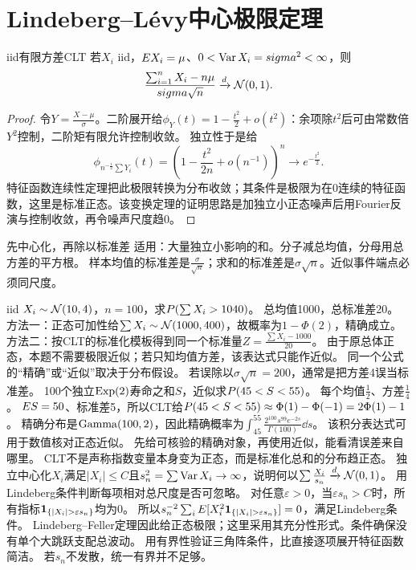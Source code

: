 \section{Lindeberg--Lévy中心极限定理}\label{sec:53}
\begin{theorem}{iid有限方差CLT}
若$X_i$ iid，$E X_i=\mu$、$0<\operatorname{Var} X_i=sigma^2<\infty$，则
\begin{equation}\dfrac{\sum_{i=1}^nX_i-n\mu}{sigma\sqrt n}\xrightarrow{d}\mathcal N(0,1).\label{eq:clt}\end{equation}
\end{theorem}
\begin{proof}
令$Y=\frac{X-\mu}{\sigma}$。二阶展开给$\phi_Y(t)=1-\frac{t^2}{2}+o(t^2)$：余项除$t^2$后可由常数倍$Y^2$控制，二阶矩有限允许控制收敛。
独立性于是给
\[\phi_{n^{-\frac{1}{2}}\sum Y_i}(t)=\left(1-\dfrac{t^2}{2n}+o(n^{-1})\right)^n\to e^{-\frac{t^2}{2}}.
\]
特征函数连续性定理把此极限转换为分布收敛；其条件是极限为在0连续的特征函数，这里是标准正态。该变换定理的证明思路是加独立小正态噪声后用Fourier反演与控制收敛，再令噪声尺度趋0。
\end{proof}
\begin{method}{先中心化，再除以标准差}
适用：大量独立小影响的和。分子减总均值，分母用总方差的平方根。
样本均值的标准差是$\frac{\sigma}{\sqrt n}$；求和的标准差是$\sigma\sqrt n$。近似事件端点必须同尺度。
\end{method}
{iid $X_i\sim\mathcal N(10,4)$，$n=100$，求$P(\sum X_i>1040)$。}
{总均值1000，总标准差20。}
{方法一：正态可加性给$\sum X_i\sim\mathcal N(1000,400)$，故概率为$1-\Phi(2)$，精确成立。
方法二：按CLT的标准化模板得到同一个标准量$Z=\frac{\sum X_i-1000}{20}$。
由于原总体正态，本题不需要极限近似；若只知均值方差，该表达式只能作近似。}
{同一个公式的“精确”或“近似”取决于分布假设。}
{若误除以$\sigma\sqrt n=200$，通常是把方差4误当标准差。}
{100个独立$\operatorname{Exp}(2)$寿命之和$S$，近似求$P(45<S<55)$。}
{每个均值$\frac{1}{2}$、方差$\frac{1}{4}$。}
{$E S=50$、标准差5，所以CLT给$P(45<S<55)\approx\Phi(1)-\Phi(-1)=2\Phi(1)-1$。
精确分布是$\operatorname{Gamma}(100,2)$，因此精确概率为$\int_{45}^{55}\frac{2^{100}s^{99}e^{-2s}}{\Gamma(100)}\dd s$。
该积分表达式可用于数值核对正态近似。}
{先给可核验的精确对象，再使用近似，能看清误差来自哪里。}
{CLT不是声称指数变量本身变为正态，而是标准化总和的分布趋正态。}
{独立中心化$X_i$满足$|X_i|\le C$且$s_n^2=\sum\operatorname{Var} X_i\to\infty$，说明何以$\sum \frac{X_i}{s_n}\xrightarrow{d}\mathcal N(0,1)$。}
{用Lindeberg条件判断每项相对总尺度是否可忽略。}
{对任意$\varepsilon>0$，当$\varepsilon s_n>C$时，所有指标$\ind_{\{|X_i|>\varepsilon s_n\}}$均为0。
所以$s_n^{-2}\sum_i\E[X_i^2\ind_{\{|X_i|>\varepsilon s_n\}}]=0$，满足Lindeberg条件。
Lindeberg--Feller定理因此给正态极限；这里采用其充分性形式。条件确保没有单个大跳跃支配总波动。}
{用有界性验证三角阵条件，比直接逐项展开特征函数简洁。}
{若$s_n$不发散，统一有界并不足够。}

